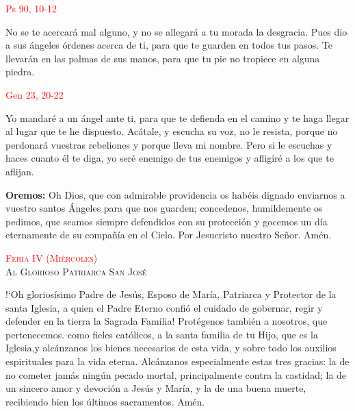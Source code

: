 \documentclass[10pt]{article}
\begin{document}
\begin{multicols}{2}
      \hfill\textcolor{red}{Ps 90, 10-12}

      No se te acercará mal alguno, y no se allegará a tu morada la desgracia. Pues dio a sus ángeles órdenes acerca de ti, para que te guarden en todos tus pasos.
      Te llevarán en las palmas de sus manos, para que tu pie no tropiece en alguna piedra.\newline
      
      \hfill\textcolor{red}{Gen 23, 20-22}
      
      Yo mandaré a un ángel ante ti, para que te defienda en el camino y te haga llegar al lugar que te he dispuesto. Acátale, y escucha su voz,
      no le resista, porque no perdonará vuestras rebeliones y porque lleva mi nombre. Pero si le escuchas y haces cuanto él te diga, yo seré
      enemigo de tus enemigos y afligiré a los que te aflijan.\newline


      \begin{otherlanguage}{latin}
            

            

            

            
      \end{otherlanguage}
      \newline

      \textbf{Oremos:} Oh Dios, que con admirable providencia os habéis dignado enviarnos a vuestro santos Ángeles para que nos guarden; concedenos, humildemente os pedimos,
      que seamos siempre defendidos con su protección y gocemos un día eternamente de su compañía en el Cielo. Por Jesucristo nuestro Señor. Amén.

      \begin{center}
            \textsc{\textcolor{red}{Feria IV (Miércoles)}\\ {\large Al Glorioso Patriarca San José}}
      \end{center}

      {!`}Oh gloriosísimo Padre de Jesús, Esposo de María, Patriarca y Protector de la santa Iglesia, a quien el Padre Eterno confió el cuidado de gobernar, regir y defender en la tierra
      la Sagrada Familia! Protégenos también a nosotros, que pertenecemos. como fieles católicos, a la santa familia de tu Hijo, que es la Iglesia,y alcánzanos los bienes necesarios de esta
      vida, y sobre todo los auxilios espirituales para la vida eterna. Alcánzanos especialmente estas tres gracias: la de no cometer jamás ningún pecado mortal, principalmente contra la castidad;
      la de un sincero amor y devoción a Jesús y María, y la de una buena muerte, recibiendo bien los últimos sacramentos. Amén.\newline


\end{multicols}
\end{document}
